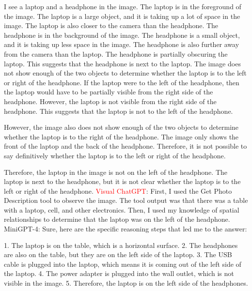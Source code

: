 \begin{enumerate}
    I see a laptop and a headphone in the image.
    The laptop is in the foreground of the image. The laptop is a large object, and it is taking up a lot of space in the image. The laptop is also closer to the camera than the headphone.
    The headphone is in the background of the image. The headphone is a small object, and it is taking up less space in the image. The headphone is also further away from the camera than the laptop.
    The headphone is partially obscuring the laptop. This suggests that the headphone is next to the laptop.
    The image does not show enough of the two objects to determine whether the laptop is to the left or right of the headphone.
    If the laptop were to the left of the headphone, then the laptop would have to be partially visible from the right side of the headphone. However, the laptop is not visible from the right side of the headphone. This suggests that the laptop is not to the left of the headphone.
    
    However, the image also does not show enough of the two objects to determine whether the laptop is to the right of the headphone. The image only shows the front of the laptop and the back of the headphone. Therefore, it is not possible to say definitively whether the laptop is to the left or right of the headphone.
    
    Therefore, the laptop in the image is not on the left of the headphone. The laptop is next to the headphone, but it is not clear whether the laptop is to the left or right of the headphone.
    \subitem \textcolor{red}{Visual ChatGPT}: First, I used the Get Photo Description tool to observe the image. The tool output was that there was a table with a laptop, cell, and other electronics. Then, I used my knowledge of spatial relationships to determine that the laptop was on the left of the headphone.
    \subitem MiniGPT-4: Sure, here are the specific reasoning steps that led me to the answer:

    1. The laptop is on the table, which is a horizontal surface.
    2. The headphones are also on the table, but they are on the left side of the laptop.
    3. The USB cable is plugged into the laptop, which means it is coming out of the left side of the laptop.
    4. The power adapter is plugged into the wall outlet, which is not visible in the image.
    5. Therefore, the laptop is on the left side of the headphones.
\end{enumerate}
